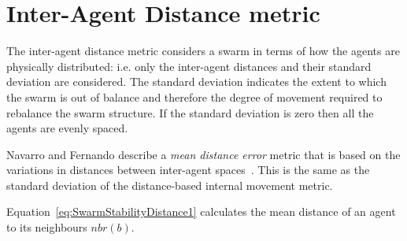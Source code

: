 \documentclass{ieeeaccess}
\begin{document}
\section{Inter-Agent Distance metric}\label{Section:DistanceDynamics}
The inter-agent distance metric considers a swarm in terms of how the agents
are physically distributed: i.e. only the inter-agent distances and their
standard deviation are considered. The standard deviation indicates the extent
to which the swarm is out of balance and therefore the degree of movement
required to rebalance the swarm structure. If the standard deviation is zero
then all the agents are evenly spaced. 


Navarro and Fernando describe a \textit{mean distance error} metric that is
based on the variations in distances between inter-agent spaces~\cite{NIM:09}.
This is the same as the standard deviation of the distance-based internal
movement metric. 



Equation~\ref{eq:SwarmStabilityDistance1} calculates the mean distance of an agent to its neighbours $nbr(b)$. 
\end{document}
